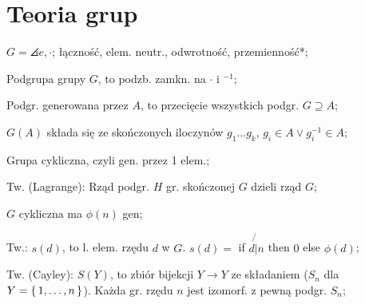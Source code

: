 \section{Teoria grup}

$G = \angles{e, \cdot}$; łączność, elem. neutr., odwrotność, przemienność*;

Podgrupa grupy $G$, to podzb. zamkn. na $\cdot$ i $^{-1}$;

Podgr. generowana przez $A$, to przecięcie wszystkich podgr. $G \supseteq A$;

$G(A)$ składa się ze skończonych iloczynów $g_1\dots g_k$,
  $g_i\in A \lor g_i^{-1} \in A$;

Grupa cykliczna, czyli gen. przez 1 elem.;

Tw. (Lagrange): Rząd podgr. $H$ gr. skończonej $G$ dzieli rząd $G$;

$G$ cykliczna ma $\phi(n)$ gen;

Tw.: $s(d)$, to l. elem. rzędu $d$ w $G$. $s(d) =$ if $d \not{|} n$ then $0$
  else $\phi(d)$;

Tw. (Cayley): $S(Y)$, to zbiór bijekcji $Y \rightarrow Y$ ze składaniem
  ($S_n$ dla $Y=\set{1,\dots,n}$). Każda gr. rzędu $n$ jest izomorf. z pewną
  podgr.  $S_n$;

